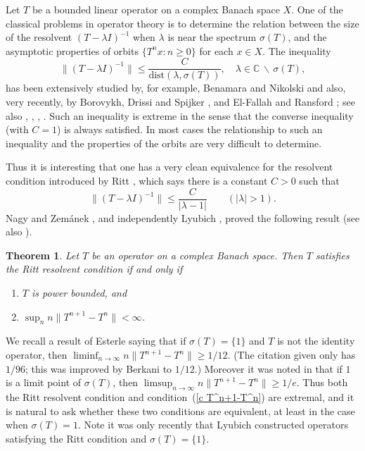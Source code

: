 \documentclass[12pt]{amsart}
\newtheorem{thm}{Theorem}[section]
\newcommand{\modo}[1]{{\left|#1\right|}}
\newcommand{\snormo}[1]{{\mathopen\|#1\mathclose\|}}
\begin{document}
Let $T$ be a bounded linear operator on a complex Banach space $X$.
One of the classical problems in operator theory is to determine
the relation between the size of the resolvent $(T-\lambda I)^{-1}$
when $\lambda$ is
near the spectrum $\sigma(T)$, and the asymptotic properties of
orbits $\{T^n x:  n \ge 0\}$ for each $x \in X$.
The inequality
\[
\snormo{(T-\lambda I)^{-1}} \le \frac{C}{\text{dist}(\lambda, \sigma (T))} ,
\quad \lambda \in \mathbb C \, \backslash \, \sigma (T),
\]
has been extensively studied by,
for example, Benamara and Nikolski \cite{benamara-nikolski}
and also, very recently, by Borovykh, Drissi and Spijker
\cite{borovykh et al}, and
El-Fallah and Ransford \cite{el-fallah-ransford};
see also \cite{lyubich2}, \cite{nagy-zemanek}, \cite{nevanlinna2},
\cite{tomilov-zemanek}.
Such an inequality is extreme in the sense that the converse
inequality (with $C=1$) is always satisfied.
In most cases the relationship to such an inequality and the properties
of the orbits are very difficult to determine.

Thus it is interesting
that one has a very clean equivalence for the resolvent
condition introduced by Ritt \cite{ritt}, which says
there is a constant $C>0$ such that
$$ \snormo{(T-\lambda I)^{-1}} \le \frac C{\modo{\lambda-1}}
   \qquad (\modo\lambda > 1) .$$
Nagy and Zem\'anek \cite{nagy-zemanek}, and independently
Lyubich \cite{lyubich1}, proved the following result
(see also \cite[Theorem 4.5.4]{navanlinna1}).

\begin{thm}
\label{ritt} Let $T$ be an operator on a complex Banach space.
Then $T$ satisfies the Ritt resolvent condition if and only if
\begin{enumerate}
\item $T$ is power bounded, and
\item \label{c T^n+1-T^n}
$\sup_n n\snormo{T^{n+1}-T^n} < \infty$.
\end{enumerate}
\end{thm}

We recall a result of Esterle \cite{esterle} saying that if
$\sigma(T)=\{1\}$ and $T$ is not the identity operator, then
$\liminf_{n\to\infty} n\snormo{T^{n+1}-T^n} \ge 1/12$.  (The
citation given only has $1/96$; this was improved by Berkani
\cite{berkani} to $1/12$.)  Moreover it was noted in \cite[Theorem
4.5.1]{navanlinna1} that if $1$ is a limit point of $\sigma(T)$,
then $\limsup_{n\to\infty} n \snormo{T^{n+1} - T^n} \ge 1/e$. Thus both the
Ritt resolvent condition and condition~(\ref{c T^n+1-T^n}) are
extremal, and it is natural to ask whether these two conditions
are equivalent, at least in the case when $\sigma(T)=1$. Note it
was only recently that Lyubich \cite{lyubich2} constructed
operators satisfying the Ritt condition and $\sigma(T) = \{1\}$.
\end{document}
